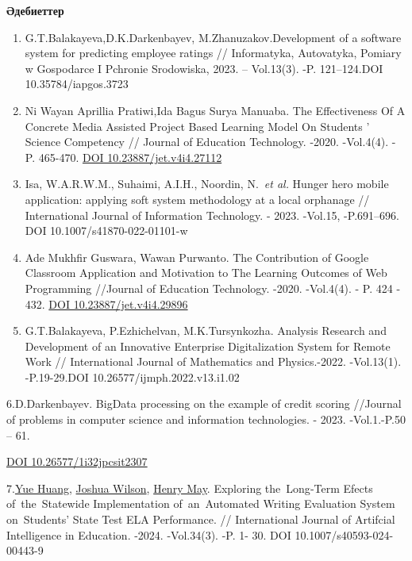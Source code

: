 {\bfseries Әдебиеттер}

\begin{enumerate}
\def\labelenumi{\arabic{enumi}.}
\item
  G.T.Balakayeva,D.K.Darkenbayev, M.Zhanuzakov.Development of a software
  system for predicting employee ratings // Informatyka, Autovatyka,
  Pomiary w Gospodarce I Pchronie Srodowiska, 2023. -- Vol.13(3). -P.
  121--124.DOI 10.35784/iapgos.3723
\item
  Ni Wayan Aprillia Pratiwi,Ida Bagus Surya Manuaba. The Effectiveness
  Of A Concrete Media Assisted Project Based Learning Model On Students
  ' Science Competency // Journal of Education
  Technology. -2020. -Vol.4(4). - P. 465-470.
  \href{https://doi.org/10.23887/jet.v4i4.27112}{DOI
  10.23887/jet.v4i4.27112}
\item
  Isa, W.A.R.W.M., Suhaimi, A.I.H., Noordin, N.~\emph{et al.} Hunger
  hero mobile application: applying soft system methodology at a local
  orphanage // International Journal of Information Technology. - 2023.
  -Vol.15, -P.691--696. DOI 10.1007/s41870-022-01101-w
\item
  Ade Mukhfir Guswara, Wawan Purwanto. The Contribution of Google
  Classroom Application and Motivation to The Learning Outcomes of Web
  Programming //Journal of Education Technology. -2020. -Vol.4(4). - P.
  424 - 432. \href{https://doi.org/10.23887/jet.v4i4.29896}{DOI
  10.23887/jet.v4i4.29896}
\item
  G.T.Balakayeva, P.Ezhichelvan, M.K.Tursynkozha. Analysis Research and
  Development of an Innovative Enterprise Digitalization System for
  Remote Work // International Journal of Mathematics and Physics.-2022.
  -Vol.13(1). -P.19-29.DOI 10.26577/ijmph.2022.v13.i1.02
\end{enumerate}

6.D.Darkenbayev. BigData processing on the example of credit scoring
//Journal of problems in computer science and information technologies.
- 2023. -Vol.1.-P.50 -- 61.

\href{https://doi.org/10.26577/1i32jpcsit2307}{DOI
10.26577/1i32jpcsit2307}

7.\href{https://link.springer.com/article/10.1007/s40593-024-00443-9\#auth-Yue-Huang-Aff1}{Yue
Huang},
\href{https://link.springer.com/article/10.1007/s40593-024-00443-9\#auth-Joshua-Wilson-Aff2}{Joshua
Wilson},
\href{https://link.springer.com/article/10.1007/s40593-024-00443-9\#auth-Henry-May-Aff2}{Henry
May}. Exploring the~Long‑Term Efects of~the~Statewide Implementation
of~an~Automated Writing Evaluation System on~Students' State Test ELA
Performance. // International Journal of Artifcial Intelligence in
Education. -2024. -Vol.34(3). -P. 1- 30. DOI 10.1007/s40593-024-00443-9

